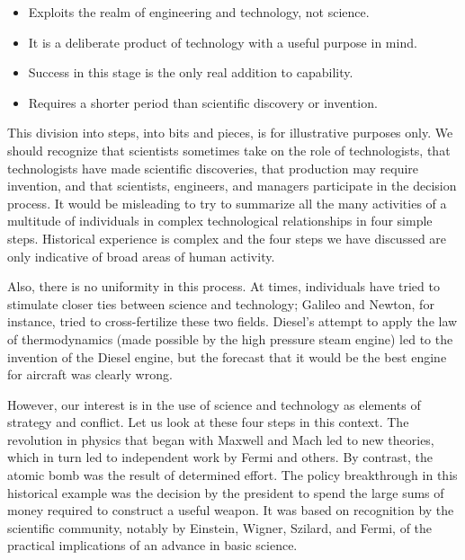  \begin{mdframed}[nobreak=true, frametitle={CHART 8: The Engineering Breakthrough}] 
    \begin{itemize}
        \item Exploits the realm of engineering and technology, not science.
        \item It is a deliberate product of technology with a useful purpose in mind.
        \item Success in this stage is the only real addition to capability.
        \item Requires a shorter period than scientific discovery or invention.
    \end{itemize}
\end{mdframed}

This division into steps, into bits and pieces, is for illustrative purposes only. We should recognize that scientists sometimes take on the role of technologists, that technologists have made scientific discoveries, that production may require invention, and that scientists, engineers, and managers participate in the decision process. It would be misleading to try to summarize all the many activities of a multitude of individuals in complex technological relationships in four simple steps. Historical experience is complex and the four steps we have discussed are only indicative of broad areas of human activity.

Also, there is no uniformity in this process. At times, individuals have tried to stimulate closer ties between science and technology; Galileo and Newton, for instance, tried to cross-fertilize these two fields. Diesel's attempt to apply the law of thermodynamics (made possible by the high pressure steam engine) led to the invention of the Diesel engine, but the forecast that it would be the best engine for aircraft was clearly wrong.

However, our interest is in the use of science and technology as elements of strategy and conflict. Let us look at these four steps in this context. The revolution in physics that began with Maxwell and Mach led to new theories, which in turn led to independent work by Fermi and others. By contrast, the atomic bomb was the result of determined effort. The policy breakthrough in this historical example was the decision by the president to spend the large sums of money required to construct a useful weapon. It was based on recognition by the scientific community, notably by Einstein, Wigner, Szilard, and Fermi, of the practical implications of an advance in basic science.

